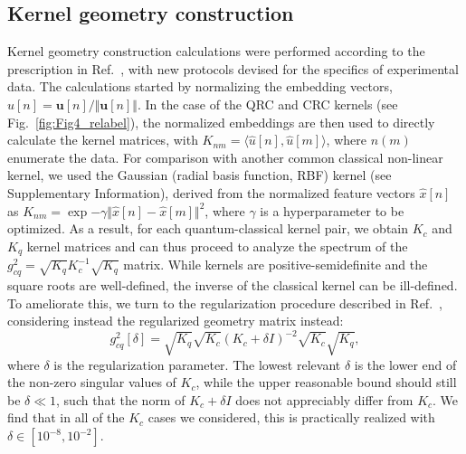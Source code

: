 \documentclass[english,floatfix,twocolumn,showpacs, aps, prx, reprint, superscriptaddress, longbibliography]{revtex4-2}
\begin{document}
\subsection{Kernel geometry construction}

Kernel geometry construction calculations were performed according to the prescription in Ref.~\cite{Huang2021}, with new protocols devised for the specifics of experimental data. The calculations started by normalizing the embedding vectors, $\hat{u}[n]=\mathbf{u}[n]/\Vert \mathbf{u}[n] \Vert$. In the case of the QRC and CRC kernels (see Fig.~\ref{fig:Fig4_relabel}), the normalized embeddings are then used to directly calculate the kernel matrices, with $K_{nm}=\langle \hat{u}[n], \hat{u}[m] \rangle$, where $n (m)$ enumerate the data. For comparison with another common classical non-linear kernel, we used the Gaussian (radial basis function, RBF) kernel (see Supplementary Information), derived from the normalized feature vectors $\hat{x}[n]$ as $K_{nm}=\exp{-\gamma\Vert \hat{x}[n] - \hat{x}[m] \Vert^2}$, where $\gamma$ is a hyperparameter to be optimized. As a result, for each quantum-classical kernel pair, we obtain $K_c$ and $K_q$ kernel matrices and can thus proceed to analyze the spectrum of the $g_{cq}^2=\sqrt{K_q}K_c^{-1}\sqrt{K_q}$ matrix. While kernels are positive-semidefinite and the square roots are well-defined, the inverse of the classical kernel can be ill-defined. To ameliorate this, we turn to the regularization procedure described in Ref.~\cite{Huang2021}, considering instead the regularized geometry matrix instead:
\begin{equation}\label{eq:reggcq}
    g_{cq}^2[\delta]=\sqrt{K_q}\sqrt{K_c}(K_c+\delta I)^{-2}\sqrt{K_c}\sqrt{K_q},
\end{equation}
where $\delta$ is the regularization parameter. The lowest relevant $\delta$ is the lower end of the non-zero singular values of $K_c$, while the upper reasonable bound should still be $\delta \ll 1$, such that the norm of $K_c+\delta I$ does not appreciably differ from $K_c$. We find that in all of the $K_c$ cases we considered, this is practically realized with $\delta \in [10^{-8}, 10^{-2}]$. 
\end{document}
